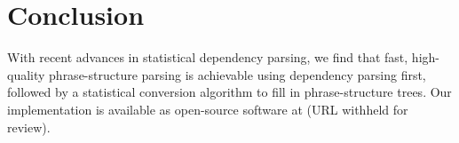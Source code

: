 \documentclass[11pt,letterpaper]{article}
\newcommand{\RuleA}[3]{#1 \rightarrow #2^*\ #3}
\newcommand{\RuleB}[3]{#1 \rightarrow #2\ #3^*}
\newcommand{\nascomment}[1]{\textcolor{blue}{\bf \small [#1 --nas]}}
\begin{document}



\section{Conclusion}

With recent advances in statistical dependency parsing, we find that
fast, high-quality phrase-structure parsing is achievable using dependency
parsing first, followed by a statistical conversion algorithm to
fill in phrase-structure trees. 
Our implementation is available as open-source software at (URL
withheld for review).












\end{document}
